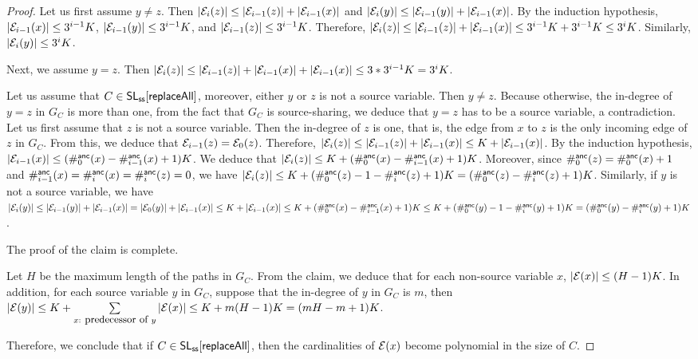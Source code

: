 \begin{proof}
Let us first assume $y \neq z$.
Then $|\mathcal{E}_{i}(z)| \le |\mathcal{E}_{i-1}(z)| + |\mathcal{E}_{i-1}(x)|$ and $|\mathcal{E}_{i}(y)| \le |\mathcal{E}_{i-1}(y)| + |\mathcal{E}_{i-1}(x)|$.  By the induction hypothesis, $|\mathcal{E}_{i-1}(x)| \le  3^{i-1} K$, $|\mathcal{E}_{i-1}(y)| \le 3^{i-1} K$, and $|\mathcal{E}_{i-1}(z)| \le 3^{i-1} K$. Therefore, $|\mathcal{E}_{i}(z)|  \le |\mathcal{E}_{i-1}(z)| + |\mathcal{E}_{i-1}(x)| \le 3^{i-1} K + 3^{i-1} K \le 3^i K$. Similarly, $|\mathcal{E}_{i}(y)| \le 3^i K$.

Next, we assume $y = z$. Then $|\mathcal{E}_{i}(z)| \le |\mathcal{E}_{i-1}(z)| + |\mathcal{E}_{i-1}(x)| + |\mathcal{E}_{i-1}(x)| \le 3* 3^{i-1} K = 3^i K$. 

Let us assume that $C \in \mathsf{SL}_{\sf ss}[\mathsf{replaceAll}]$, moreover, either $y$ or $z$ is not a source variable. Then $y \neq z$. Because otherwise, the in-degree of $y=z$ in $G_C$ is more than one, from the fact that $G_C$ is source-sharing, we deduce that $y=z$ has to be a source variable, a contradiction. Let us first assume that $z$ is not a source variable. Then the in-degree of $z$ is one, that is, the edge from $x$ to $z$ is the only incoming edge of $z$ in $G_C$. From this, we deduce that  $\mathcal{E}_{i-1}(z) = \mathcal{E}_0(z)$. Therefore, $|\mathcal{E}_{i}(z)| \le |\mathcal{E}_{i-1}(z)| + |\mathcal{E}_{i-1}(x)| \le K + |\mathcal{E}_{i-1}(x)|$. By the induction hypothesis, $|\mathcal{E}_{i-1}(x)| \le (\#^{\sf anc}_{0}(x) - \#^{\sf anc}_{i-1}(x)+1)K$. We deduce that $|\mathcal{E}_{i}(z)| \le K+ (\#^{\sf anc}_{0}(x) - \#^{\sf anc}_{i-1}(x)+1)K$. Moreover, since $\#^{\sf anc}_{0}(z) = \#^{\sf anc}_{0}(x)+1$ and $\#^{\sf anc}_{i-1}(x)=\#^{\sf anc}_{i}(x)= \#^{\sf anc}_{i}(z)=0$, we have $|\mathcal{E}_{i}(z)| \le K+ (\#^{\sf anc}_{0}(z)-1 - \#^{\sf anc}_{i}(z)+1)K = (\#^{\sf anc}_{0}(z) - \#^{\sf anc}_{i}(z)+1)K$.
Similarly, if $y$ is not a source variable, we have $|\mathcal{E}_{i}(y)| \le |\mathcal{E}_{i-1}(y)| + |\mathcal{E}_{i-1}(x)| = |\mathcal{E}_{0}(y)| + |\mathcal{E}_{i-1}(x)| \le K+|\mathcal{E}_{i-1}(x)| \le K+ (\#^{\sf anc}_{0}(x) - \#^{\sf anc}_{i-1}(x)+1)K \le K+ (\#^{\sf anc}_{0}(y)-1 - \#^{\sf anc}_{i}(y)+1)K = (\#^{\sf anc}_{0}(y) - \#^{\sf anc}_{i}(y)+1)K$.

The proof of the claim is complete.

Let $H$ be the maximum length of the paths in $G_C$. From the claim, we deduce that for each non-source variable $x$, $|\mathcal{E}(x)| \le (H-1)K$. In addition, for each source variable $y$ in $G_C$, suppose that the in-degree of $y$ in $G_C$ is $m$, then $|\mathcal{E}(y)| \le K + \sum \limits_{x: \mbox{ \small predecessor of } y} |\mathcal{E}(x)| \le  K+m(H-1)K=(mH-m+1) K$.
%

Therefore, we conclude that if $C \in \mathsf{SL}_{\sf ss}[\mathsf{replaceAll}]$, then the cardinalities of $\mathcal{E}(x)$ become polynomial in the size of $C$. 
\end{proof}

